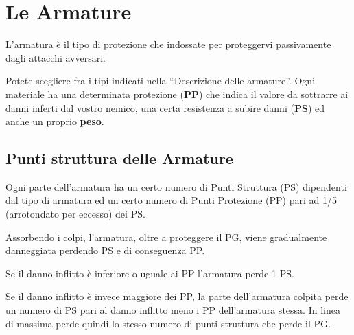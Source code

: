 \section{Le Armature} 

L'armatura \`e il tipo di protezione che indossate
per proteggervi passivamente dagli attacchi avversari.  

Potete scegliere fra i tipi indicati nella ``Descrizione delle
armature''.  Ogni materiale ha una determinata protezione
(\textbf{PP}) che indica il valore da sottrarre ai danni inferti dal
vostro nemico, una certa resistenza a subire danni (\textbf{PS}) ed
anche un proprio \textbf{peso}.

{\raggedright \subsection{Punti struttura delle Armature}}
\label{psarmature}

Ogni parte dell'armatura ha un certo numero di Punti Struttura (PS)
dipendenti dal tipo di armatura ed un certo numero di Punti Protezione
(PP) pari ad 1/5 (arrotondato per eccesso) dei PS.

Assorbendo i colpi, l'armatura, oltre a proteggere il PG, viene
gradualmente danneggiata perdendo PS e di conseguenza PP.

Se il danno inflitto \`e inferiore o uguale ai PP
l'armatura perde 1 PS. 

Se il danno inflitto \`e invece maggiore dei
PP, la parte dell'armatura colpita perde un numero di PS pari al danno
inflitto meno i PP dell'armatura stessa. In linea di massima perde
quindi lo stesso numero di punti struttura che perde il PG. 

\iffullversion
{}


\fi
